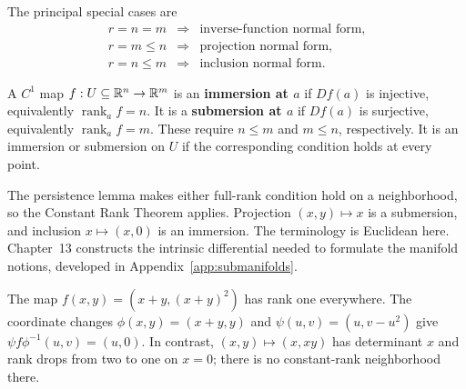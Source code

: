 The principal special cases are
\[
\begin{array}{ccl}
r=n=m&\Rightarrow&\text{inverse-function normal form},\\
r=m\leq n&\Rightarrow&\text{projection normal form},\\
r=n\leq m&\Rightarrow&\text{inclusion normal form}.
\end{array}
\]
\begin{definition}\label{def:immersion-submersion}
A $C^1$ map $f:U\subseteq\mathbb{R}^n\to\mathbb{R}^m$ is an \textbf{immersion at $a$}
if $Df(a)$ is injective, equivalently $\operatorname{rank}_a f=n$.
It is a \textbf{submersion at $a$} if $Df(a)$ is surjective,
equivalently $\operatorname{rank}_a f=m$. These require $n\leq m$ and
$m\leq n$, respectively. It is an immersion or submersion on $U$ if the
corresponding condition holds at every point.
\end{definition}
The persistence lemma makes either full-rank condition hold on a
neighborhood, so the Constant Rank Theorem applies. Projection
$(x,y)\mapsto x$ is a submersion, and inclusion $x\mapsto(x,0)$ is an
immersion. The terminology is Euclidean here. Chapter~13 constructs the intrinsic
differential needed to formulate the manifold notions, developed in
Appendix~\ref{app:submanifolds}.
\begin{example}
The map $f(x,y)=(x+y,(x+y)^2)$ has rank one everywhere.
The coordinate changes $\phi(x,y)=(x+y,y)$ and
$\psi(u,v)=(u,v-u^2)$ give $\psi f\phi^{-1}(u,v)=(u,0)$.
In contrast, $(x,y)\mapsto(x,xy)$ has determinant $x$ and rank drops
from two to one on $x=0$; there is no constant-rank neighborhood there.
\end{example}

